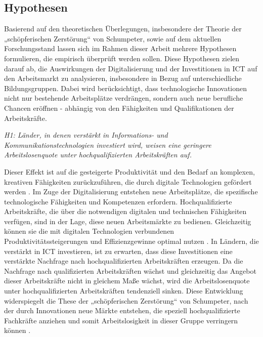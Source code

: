 
\subsection{Hypothesen}

Basierend auf den theoretischen Überlegungen, insbesondere der Theorie der „schöpferischen 
Zerstörung“ von Schumpeter, sowie auf dem aktuellen Forschungsstand lassen sich im Rahmen 
dieser Arbeit mehrere Hypothesen formulieren, die empirisch überprüft werden sollen. Diese 
Hypothesen zielen darauf ab, die Auswirkungen der Digitalisierung und der Investitionen in 
\ac{ICT} auf den Arbeitsmarkt zu analysieren, insbesondere in Bezug auf unterschiedliche 
Bildungsgruppen. Dabei wird berücksichtigt, dass technologische Innovationen nicht nur 
bestehende Arbeitsplätze verdrängen, sondern auch neue berufliche Chancen eröffnen - abhängig 
von den Fähigkeiten und Qualifikationen der Arbeitskräfte.

\textit{H1: Länder, in denen verstärkt in Informations- und Kommunikationstechnologien 
investiert wird, weisen eine geringere Arbeitslosenquote unter hochqualifizierten Arbeitskräften auf.}

Dieser Effekt ist auf die gesteigerte Produktivität und den Bedarf an komplexen, kreativen 
Fähigkeiten zurückzuführen, die durch digitale Technologien gefördert werden 
\parencite[S. 5ff]{acemoglu2002technical}. Im Zuge der Digitalisierung entstehen neue Arbeitsplätze, 
die spezifische technologische Fähigkeiten und Kompetenzen erfordern. Hochqualifizierte 
Arbeitskräfte, die über die notwendigen digitalen und technischen Fähigkeiten verfügen, sind 
in der Lage, diese neuen Arbeitsmärkte zu bedienen. Gleichzeitig können sie die mit digitalen 
Technologien verbundenen Produktivitätssteigerungen und Effizienzgewinne optimal nutzen 
\parencite[Kap. 2]{brynjolfsson2014thesecond}. In Ländern, die verstärkt in \ac{ICT} investieren, ist 
zu erwarten, dass diese Investitionen eine verstärkte Nachfrage nach hochqualifizierten 
Arbeitskräften erzeugen. Da die Nachfrage nach qualifizierten Arbeitskräften wächst und 
gleichzeitig das Angebot dieser Arbeitskräfte nicht in gleichem Maße wächst, wird die 
Arbeitslosenquote unter hochqualifizierten Arbeitskräften tendenziell sinken. Diese 
Entwicklung widerspiegelt die These der „schöpferischen Zerstörung“ von Schumpeter, nach der 
durch Innovationen neue Märkte entstehen, die speziell hochqualifizierte Fachkräfte anziehen 
und somit Arbeitslosigkeit in dieser Gruppe verringern können 
\parencite[S. 103ff]{schumpeter1976capitalism}.

